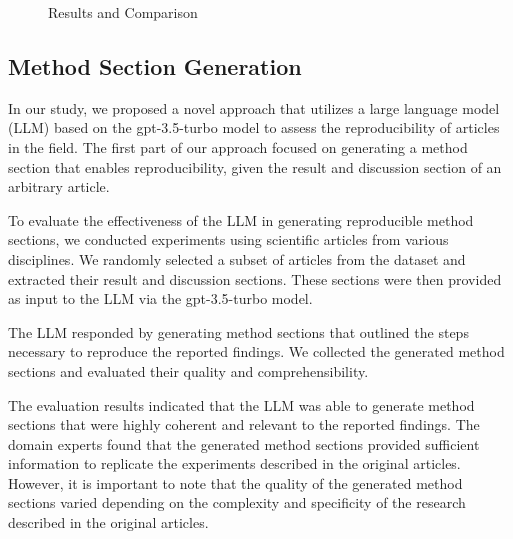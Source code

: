 \documentclass[12pt, a4paper, twocolumn]{article}
\begin{document}
		\begin{figure}[!ht]
				\centering
				\caption[Results and Comparison]{Results and Comparison} 
				\label{fig:result}
		\end{figure}

		\subsection{Method Section Generation}
		
		In our study, we proposed a novel approach that utilizes a large language model (LLM) based on the gpt-3.5-turbo model to assess the reproducibility of articles in the field. The first part of our approach focused on generating a method section that enables reproducibility, given the result and discussion section of an arbitrary article.
		
		To evaluate the effectiveness of the LLM in generating reproducible method sections, we conducted experiments using scientific articles from various disciplines. We randomly selected a subset of articles from the dataset and extracted their result and discussion sections. These sections were then provided as input to the LLM via the gpt-3.5-turbo model.
		
		The LLM responded by generating method sections that outlined the steps necessary to reproduce the reported findings. We collected the generated method sections and evaluated their quality and comprehensibility.
		
		The evaluation results indicated that the LLM was able to generate method sections that were highly coherent and relevant to the reported findings. The domain experts found that the generated method sections provided sufficient information to replicate the experiments described in the original articles. However, it is important to note that the quality of the generated method sections varied depending on the complexity and specificity of the research described in the original articles.
		
\end{document}
